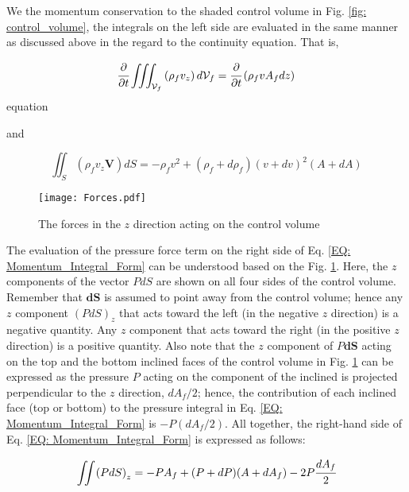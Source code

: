 \documentclass[../Article_Model_Parameters.tex]{subfiles}
\begin{document}
	We the momentum conservation to the shaded control volume in Fig. \ref{fig: control_volume}, the integrals on the left side are evaluated in the same manner as discussed above in the regard to the continuity equation. That is,
	
	{\footnotesize
		\begin{equation}
			\cfrac{\partial}{\partial t} \iiint_{\mathcal{V}_f} \left( \rho_f v_z \right) d \mathcal{V}_f = \cfrac{\partial}{\partial t} \left( \rho_f v A_f dz \right)
			\label{EQ: Force_Continuity_Monenmtum}
		\end{equation}equation
	}
	
	and 
	
	{\footnotesize
		\begin{equation}
			\iint_S \left( \rho_f v_z \textbf{V} \right) dS = -\rho_f v^2 + \left( \rho_f + d \rho_f \right) \left( v+dv \right)^2 \left( A+dA \right)
		\end{equation}
	}
	
	\begin{figure}[h]
		\centering
		\texttt{[image: Forces.pdf]}
		\caption{The forces in the $z$ direction acting on the control volume}
		\label{fig: Forces_Momentum_Control_Volume}
	\end{figure}
	
	The evaluation of the pressure force term on the right side of Eq. \ref{EQ: Momentum_Integral_Form} can be understood based on the Fig. \ref{fig: Forces_Momentum_Control_Volume}. Here, the $z$ components of the vector $PdS$ are shown on all four sides of the control volume. Remember that $\textbf{dS}$ is assumed to point away from the control volume; hence  any $z$ component $\left( PdS \right)_z$ that acts toward the left (in the negative $z$ direction) is a negative quantity. Any $z$ component that acts toward the right (in the positive $z$ direction) is a positive quantity. Also note that the $z$ component of $P\textbf{dS}$ acting on the top and the bottom inclined faces of the control volume in Fig. \ref{fig: Forces_Momentum_Control_Volume} can be expressed as the pressure $P$ acting on the component of the inclined is projected perpendicular to the $z$ direction, $dA_f/2$; hence, the contribution of each inclined face (top or bottom) to the pressure integral in Eq. \ref{EQ: Momentum_Integral_Form} is $-P(dA_f/2)$. All together, the right-hand side of Eq. \ref{EQ: Momentum_Integral_Form} is expressed as follows:
	
	{\footnotesize
		\begin{equation}
			\iint \left( PdS \right)_z = -PA_f + (P+dP)(A+dA_f)-2P\cfrac{dA_f}{2}
			\label{EQ: Force_Integral_Varying_Cross_Section}
		\end{equation}
	}
	
\end{document}
